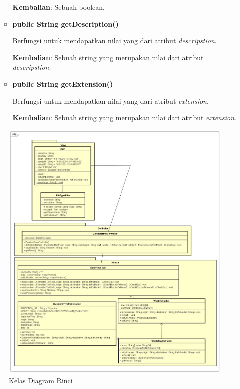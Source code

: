 \begin{enumerate}
\begin{itemize}
		\textbf{Kembalian}: Sebuah boolean.
		
		\item \textbf{public String getDescription()}
		
		Berfungsi untuk mendapatkan nilai yang dari atribut \textit{descripstion}.
		
	\textbf{Kembalian}: Sebuah string yang merupakan nilai dari atribut \textit{descripstion}.
		
		\item \textbf{public String getExtension()}
		
		Berfungsi untuk mendapatkan nilai yang dari atribut \textit{extension}.
		
	\textbf{Kembalian}: Sebuah string yang merupakan nilai dari atribut \textit{extension}.
		
	\end{itemize}
\end{enumerate}

\begin{figure}[H]
				\centering		
				\includegraphics[scale=0.35]{Gambar/classdiagramlengkap.png}
				\caption[Kelas Diagram Rinci]{Kelas Diagram Rinci}
				\label{fig:kelasdiagramrinci}	
			\end{figure}
			
